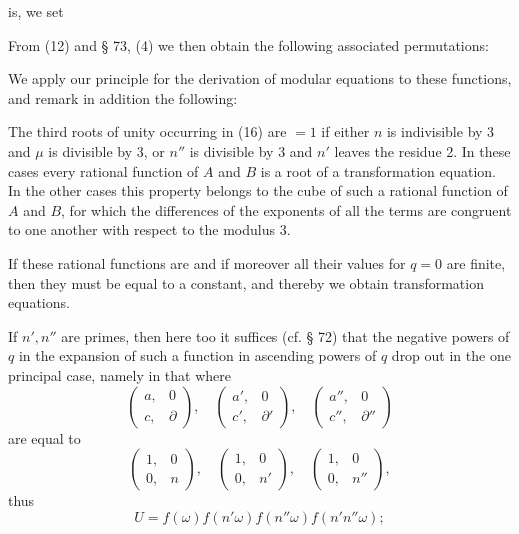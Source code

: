 is, we set

From (12) and § 73, (4) we then obtain the following associated
permutations:

We apply our principle for the derivation of modular equations to these
functions, and remark in addition the following:

The third roots of unity occurring in (16) are $=1$ if either $n$ is
indivisible by 3 and $\mu$ is divisible by 3, or $n''$ is divisible by 3
and $n'$ leaves the residue 2. In these cases every rational function of
$A$ and $B$ is a root of a transformation equation. In the other cases
this property belongs to the cube of such a rational function of $A$ and
$B$, for which the differences of the exponents of all the terms are
congruent to one another with respect to the modulus 3.

If these rational functions are  and if
moreover all their values for $q = 0$ are finite, then they must be equal
to a constant, and thereby we obtain transformation equations.

If $n', n''$ are primes, then here too it suffices (cf. § 72) that the
negative powers of $q$ in the expansion of such a function in ascending
powers of $q$ drop out in the one principal case, namely in that where
\[
\begin{pmatrix} a, & 0 \\ c, & \partial \end{pmatrix}, \quad
\begin{pmatrix} a', & 0 \\ c', & \partial' \end{pmatrix}, \quad
\begin{pmatrix} a'', & 0 \\ c'', & \partial'' \end{pmatrix}
\]
are equal to
\[
\begin{pmatrix} 1, & 0 \\ 0, & n \end{pmatrix}, \quad
\begin{pmatrix} 1, & 0 \\ 0, & n' \end{pmatrix}, \quad
\begin{pmatrix} 1, & 0 \\ 0, & n'' \end{pmatrix},
\]
thus
\[
U = f(\omega)f(n'\omega)f(n''\omega)f(n'n''\omega);
\]
